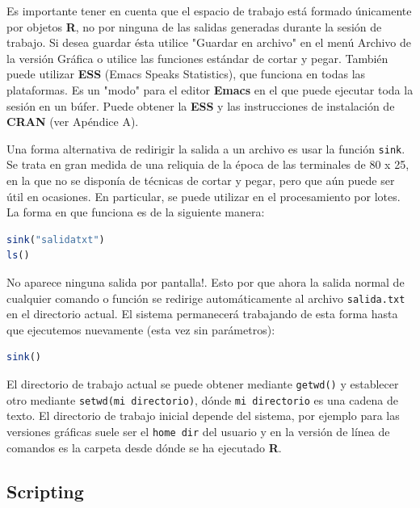 \documentclass[spanish]{extbook}
\numberwithin{equation}{section}
\numberwithin{figure}{section}
\begin{document}
Es importante tener en cuenta que el espacio de trabajo está formado únicamente
por objetos \textbf{R}, no por ninguna de las salidas generadas durante la
sesión de trabajo.  Si desea guardar ésta utilice "Guardar en archivo" en el
menú Archivo de la versión Gráfica o utilice las funciones estándar de cortar y
pegar. También puede utilizar \textbf{ESS} (Emacs Speaks Statistics), que
funciona en todas las plataformas. Es un "modo" para el editor \textbf{Emacs}
en el que puede ejecutar toda la sesión en un búfer. Puede obtener la
\textbf{ESS} y las instrucciones de instalación de \textbf{CRAN} (ver Apéndice
A).  

Una forma alternativa de redirigir la salida a un archivo es usar la función
\texttt{sink}. Se trata en gran medida de una reliquia de la época de las
terminales de 80 x 25, en la que no se disponía de técnicas de cortar y pegar,
pero que aún puede ser útil en ocasiones. En particular, se puede utilizar en
el procesamiento por lotes. La forma en que funciona es de la siguiente manera:

\begin{lstlisting}[language=R]
sink("salidatxt")
ls()
\end{lstlisting}

No aparece ninguna salida por pantalla!. Esto por que ahora la salida normal de
cualquier comando o función se redirige automáticamente al archivo
\texttt{salida.txt} en el directorio actual.  El sistema permanecerá trabajando
de esta forma hasta que ejecutemos nuevamente (esta vez sin parámetros):

\begin{lstlisting}[language=R]
sink()
\end{lstlisting}

El directorio de trabajo actual se puede obtener mediante \texttt{getwd()} y
establecer otro mediante \texttt{setwd(mi directorio)}, dónde \texttt{mi
directorio} es una cadena de texto. El directorio de trabajo inicial depende
del sistema, por ejemplo para las versiones gráficas suele ser el \texttt{home
dir} del usuario y en la versión de línea de comandos es la carpeta desde dónde
se ha ejecutado \textbf{R}.

\subsection{Scripting}
\end{document}
